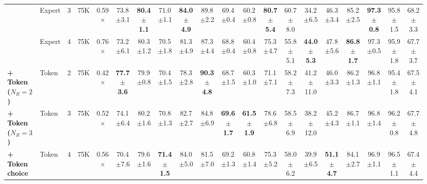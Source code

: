 {\begin{tabular}{l l c c c c c c c c c c c c c c c c c c}
 & Expert & 3 & 75K & 0.59$\times$ & 73.8{\scriptsize$\pm$3.1} & \textbf{80.4{\scriptsize$\pm$1.1}} & 71.0{\scriptsize$\pm$1.1} & \textbf{84.0{\scriptsize$\pm$4.9}} & 89.8{\scriptsize$\pm$2.2} & 69.4{\scriptsize$\pm$0.4} & 60.2{\scriptsize$\pm$0.8} & \textbf{80.7{\scriptsize$\pm$5.4}} & 60.7{\scriptsize$\pm$8.0} & 34.2{\scriptsize$\pm$6.5} & 46.3{\scriptsize$\pm$3.4} & 85.2{\scriptsize$\pm$2.5} & \textbf{97.3{\scriptsize$\pm$0.8}} & 95.8{\scriptsize$\pm$1.5} & 68.2{\scriptsize$\pm$3.3} \\
 & Expert & 4 & 75K & 0.76$\times$ & 73.2{\scriptsize$\pm$6.1} & 80.3{\scriptsize$\pm$1.2} & 70.5{\scriptsize$\pm$1.8} & 81.3{\scriptsize$\pm$4.9} & 87.3{\scriptsize$\pm$4.4} & 68.8{\scriptsize$\pm$0.4} & 60.4{\scriptsize$\pm$0.8} & 75.3{\scriptsize$\pm$4.7} & 55.8{\scriptsize$\pm$5.1} & \textbf{44.0{\scriptsize$\pm$5.3}} & 47.8{\scriptsize$\pm$5.6} & \textbf{86.8{\scriptsize$\pm$1.7}} & 97.3{\scriptsize$\pm$0.5} & 95.9{\scriptsize$\pm$1.8} & 67.7{\scriptsize$\pm$3.7} \\
\textbf{\quad + Token ($N_R{=}2$)} & Token & 2 & 75K & 0.42$\times$ & \textbf{77.7{\scriptsize$\pm$3.6}} & 79.9{\scriptsize$\pm$0.8} & 70.4{\scriptsize$\pm$1.5} & 78.3{\scriptsize$\pm$2.8} & \textbf{90.3{\scriptsize$\pm$4.8}} & 68.7{\scriptsize$\pm$1.5} & 60.3{\scriptsize$\pm$1.0} & 71.1{\scriptsize$\pm$7.1} & 58.2{\scriptsize$\pm$7.3} & 41.2{\scriptsize$\pm$11.0} & 46.0{\scriptsize$\pm$3.3} & 86.2{\scriptsize$\pm$1.3} & 96.8{\scriptsize$\pm$1.1} & 95.4{\scriptsize$\pm$1.8} & 67.5{\scriptsize$\pm$4.1} \\
\textbf{\quad + Token ($N_R{=}3$)} & Token & 3 & 75K & 0.52$\times$ & 74.1{\scriptsize$\pm$6.4} & 80.2{\scriptsize$\pm$1.6} & 70.8{\scriptsize$\pm$1.3} & 82.7{\scriptsize$\pm$2.7} & 84.8{\scriptsize$\pm$6.9} & \textbf{69.6{\scriptsize$\pm$1.7}} & \textbf{61.5{\scriptsize$\pm$1.9}} & 78.6{\scriptsize$\pm$6.8} & 58.5{\scriptsize$\pm$6.9} & 38.2{\scriptsize$\pm$12.0} & 45.2{\scriptsize$\pm$4.3} & 86.7{\scriptsize$\pm$1.1} & 96.8{\scriptsize$\pm$1.4} & 96.2{\scriptsize$\pm$0.8} & 67.7{\scriptsize$\pm$4.8} \\
\textbf{\quad + Token choice} & Token & 4 & 75K & 0.56$\times$ & 70.4{\scriptsize$\pm$7.6} & 79.6{\scriptsize$\pm$1.6} & \textbf{71.4{\scriptsize$\pm$1.5}} & 84.0{\scriptsize$\pm$5.0} & 81.5{\scriptsize$\pm$7.0} & 69.2{\scriptsize$\pm$1.3} & 60.8{\scriptsize$\pm$1.4} & 75.3{\scriptsize$\pm$5.2} & 58.0{\scriptsize$\pm$6.2} & 39.9{\scriptsize$\pm$6.5} & \textbf{51.1{\scriptsize$\pm$4.7}} & 84.1{\scriptsize$\pm$2.7} & 96.9{\scriptsize$\pm$1.1} & 96.5{\scriptsize$\pm$1.1} & 67.4{\scriptsize$\pm$4.4} \\
\bottomrule
\end{tabular}}
